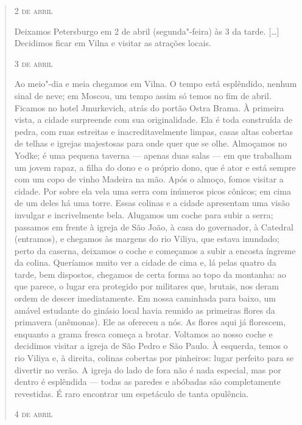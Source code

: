 \begin{quote}
\begin{flushright}
\textsc{2 de abril}
\end{flushright}
\smallskip

Deixamos Petersburgo em 2 de abril (segunda"-feira) às 3 da tarde.
[\ldots{}] Decidimos ficar em Vilna e visitar as atrações locais.

\medskip
\begin{flushright}
\textsc{3 de abril}
\end{flushright}
\smallskip

Ao meio"-dia e meia chegamos em Vilna. O tempo está esplêndido, nenhum
sinal de neve; em Moscou, um tempo assim só temos no fim de abril.
Ficamos no hotel Jmurkevich, atrás do portão Ostra Brama. À primeira
vista, a cidade surpreende com sua originalidade. Ela é toda construída
de pedra, com ruas estreitas e inacreditavelmente limpas, casas altas
cobertas de telhas e igrejas majestosas para onde quer que se olhe.
Almoçamos no Yodke; é uma pequena taverna --- apenas duas salas --- em que
trabalham um jovem rapaz, a filha do dono e o próprio dono, que é ator e
está sempre com um copo de vinho Madeira na mão. Após o almoço, fomos
visitar a cidade. Por sobre ela vela uma serra com inúmeros picos
cônicos; em cima de um deles há uma torre. Essas colinas e a cidade
apresentam uma visão invulgar e incrivelmente bela. Alugamos um coche
para subir a serra; passamos em frente à igreja de São João, à casa do
governador, à Catedral (entramos), e chegamos às margens do rio Viliya,
que estava inundado; perto da caserna, deixamos o coche e começamos a
subir a encosta íngreme da colina. Queríamos muito ver a cidade de cima
e, lá pelas quatro da tarde, bem dispostos, chegamos de certa forma ao
topo da montanha: ao que parece, o lugar era protegido por militares
que, brutais, nos deram ordem de descer imediatamente. Em nossa
caminhada para baixo, um amável estudante do ginásio local havia reunido
as primeiras flores da primavera (anêmonas). Ele as ofereceu a nós. As
flores aqui já florescem, enquanto a grama fresca começa a brotar.
Voltamos ao nosso coche e decidimos visitar a igreja de São Pedro e São
Paulo. À esquerda, temos o rio Viliya e, à direita, colinas cobertas por
pinheiros: lugar perfeito para se divertir no verão. A igreja do lado de
fora não é nada especial, mas por dentro é esplêndida --- todas as paredes
e abóbadas são completamente revestidas. É raro encontrar um espetáculo
de tanta opulência.

\medskip
\begin{flushright}
\textsc{4 de abril}
\end{flushright}
\smallskip


\end{quote}
